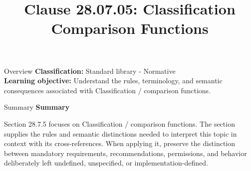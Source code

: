 \documentclass[10pt,letterpaper]{article}
\title{Clause 28.07.05: Classification Comparison Functions}
\author{}
\date{}
\begin{document}
\maketitle
\begin{CornellOverviewBox}{Overview}
\textbf{Classification:} Standard library - Normative\\[2pt]
\textbf{Learning objective:} Understand the rules, terminology, and semantic consequences associated with Classification / comparison functions.
\end{CornellOverviewBox}\begin{CornellSummaryBox}{Summary}
{\sffamily\bfseries\color{Accent} Summary}\par\vspace{3pt}Section 28.7.5 focuses on Classification / comparison functions. The section supplies the rules and semantic distinctions needed to interpret this topic in context with its cross-references. When applying it, preserve the distinction between mandatory requirements, recommendations, permissions, and behavior deliberately left undefined, unspecified, or implementation-defined.
\end{CornellSummaryBox}
\end{document}
